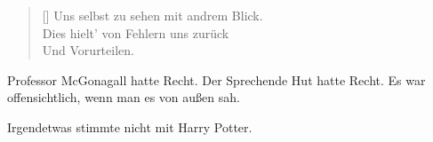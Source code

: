 
\baselineskip\settowidth{\versewidth}{Ach, gäb' uns höh're Macht das Glück}
\begin{verse}[\versewidth]
Uns selbst zu sehen mit andrem Blick.\\
Dies hielt' von Fehlern uns zurück\\
Und Vorurteilen.
\end{verse}

Professor McGonagall hatte Recht. Der Sprechende Hut hatte Recht. Es war offensichtlich, wenn man es von außen sah.

Irgendetwas stimmte nicht mit Harry Potter.

